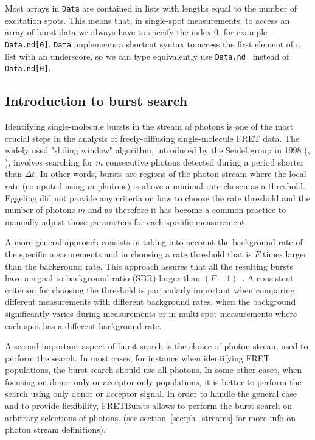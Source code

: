 Most arrays in \texttt{Data} are contained in lists with lengths equal to the
number of excitation spots. This means that, in
single-spot measurements, to access an array of burst-data
we always have to specify the index 0, for example \verb|Data.nd[0]|.
\verb|Data| implements a shortcut syntax to access the first element of a list
with an underscore, so we can type equivalently use
\verb|Data.nd_| instead of \verb|Data.nd[0]|.

\subsection{Introduction to burst search}
\label{sec:burstsearch_intro}

Identifying single-molecule bursts in the stream of photons is
one of the most crucial steps in the analysis of freely-diffusing single-molecule FRET data.
The widely used "sliding window" algorithm, introduced by the Seidel group in 1998
(\cite{Eggeling_1998}, \cite{Fries_1998}), involves searching for
$m$ consecutive photons detected during a period shorter than
$\Delta t$. In other words, bursts are regions of the photon stream where the
local rate (computed using $m$ photons) is above a minimal rate chosen as a
threshold. Eggeling did not provide any criteria on how to choose the rate
threshold and the number of photons $m$ and as therefore it has become a common
practice to manually adjust those parameters for each specific measurement.

A more general approach consists in taking into account the background rate of
the specific measurements and in choosing a rate threshold that is $F$ times
larger than the background rate. This approach assures that all the resulting bursts
have a signal-to-background ratio (SBR) larger than
$(F-1)$~\cite{Michalet_2012}. A consistent criterion for choosing the threshold is
particularly important when comparing different measurements with different background
rates, when the background significantly varies during measurements or in
multi-spot measurements where each spot has a different background rate.

A second important aspect of burst search is the choice of photon stream used
to perform the search.
In most cases, for instance when identifying FRET populations,
the burst search should use all photons. In some other cases, when focusing on
donor-only or acceptor only populations, it is better to perform the search using
only donor or acceptor signal.
In order to handle the general case and to provide flexibility,
FRETBursts allows to perform the burst search on arbitrary selections of photons.
(see section~\ref{sec:ph_streams} for more info on photon stream definitions).

